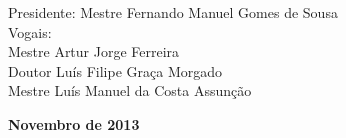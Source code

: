 \begin{titlepage}
\begin{center}
\begin{tabbing}
		   \fontsize{11pt}{10pt}\selectfont
		   \hspace{1.1cm}Presidente: Mestre Fernando Manuel Gomes de Sousa \\
		   \fontsize{11pt}{10pt}\selectfont
		   \hspace{1.1cm}Vogais: \\
		   \fontsize{11pt}{10pt}\selectfont
		   \hspace{2.2cm}Mestre Artur Jorge Ferreira \\
		   \fontsize{11pt}{10pt}\selectfont
		   \hspace{2.2cm}Doutor Luís Filipe Graça Morgado\\
		   \fontsize{11pt}{10pt}\selectfont
		   \hspace{2.2cm}Mestre Luís Manuel da Costa Assunção\\
		\end{tabbing}
		
		\fontsize{10pt}{10pt}\selectfont
		\textbf{Novembro de 2013}
	\end{center}
\end{titlepage}
